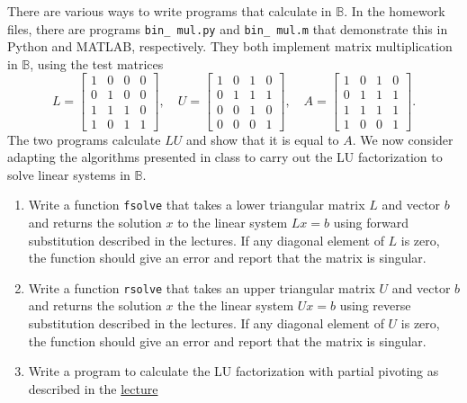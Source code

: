 \documentclass[11pt]{article}
\newcommand{\B}{\mathbb{B}}
\begin{document}
\begin{enumerate}
    There are various ways to write programs that calculate in $\B$. In the homework
    files, there are programs \texttt{bin\_\,mul.py} and \texttt{bin\_\,mul.m}
    that demonstrate this in Python and MATLAB, respectively. They both
    implement matrix multiplication in $\B$, using the test matrices
    \[
    L=\left[
    \begin{array}{cccc}
      1 & 0 & 0 & 0 \\
      0 & 1 & 0 & 0 \\
      1 & 1 & 1 & 0 \\
      1 & 0 & 1 & 1
    \end{array}
    \right],
    \quad
    U=\left[
    \begin{array}{cccc}
      1 & 0 & 1 & 0 \\
      0 & 1 & 1 & 1 \\
      0 & 0 & 1 & 0 \\
      0 & 0 & 0 & 1
    \end{array}
    \right],
    \quad
    A=\left[
    \begin{array}{cccc}
      1 & 0 & 1 & 0 \\
      0 & 1 & 1 & 1 \\
      1 & 1 & 1 & 1 \\
      1 & 0 & 0 & 1
    \end{array}
    \right].
    \]
    The two programs calculate $LU$ and show that it is equal to $A$. We now
    consider adapting the algorithms presented in class to carry out the LU
    factorization to solve linear systems in $\B$.
    \begin{enumerate}
      \item Write a function \texttt{fsolve} that takes a lower triangular
	matrix $L$ and vector $b$ and returns the solution $x$ to the linear
	system $Lx=b$ using forward substitution described in the lectures.
	If any diagonal element of $L$ is zero, the function should give
	an error and report that the matrix is singular.
      \item Write a function \texttt{rsolve} that takes an upper triangular
	matrix $U$ and vector $b$ and returns the solution $x$ the the linear
	system $Ux=b$ using reverse substitution described in the lectures.
	If any diagonal element of $U$ is zero, the function should give
	an error and report that the matrix is singular.
      \item Write a program to calculate the LU factorization with
	partial pivoting as described in the
	\href{http://iacs-courses.seas.harvard.edu/courses/am205/slides/am205_lec07.pdf}{lecture
}
\end{enumerate}
\end{enumerate}
\end{document}

